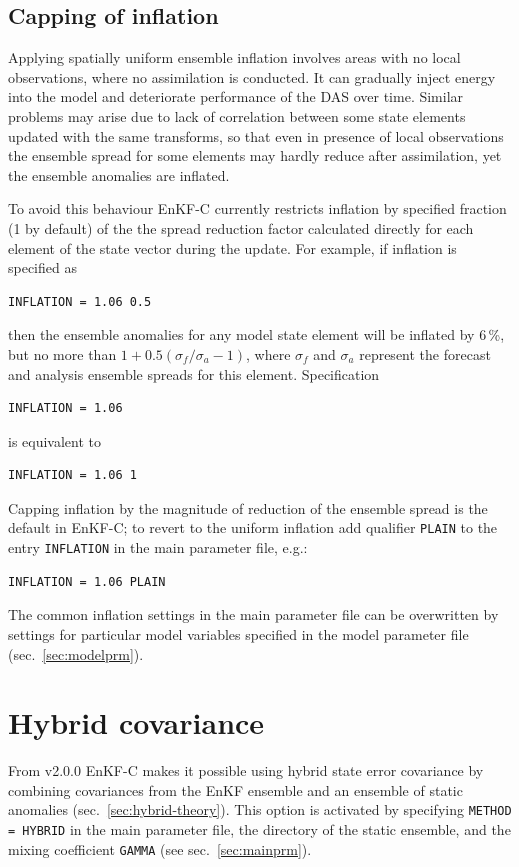 \documentclass[11pt]{report}
\begin{document}
\subsection{Capping of inflation}
\label{sec:capping}

Applying spatially uniform ensemble inflation involves areas with no local observations, where no assimilation is conducted.
It can gradually inject energy into the model and deteriorate performance of the DAS over time.
Similar problems may arise due to lack of correlation between some state elements updated with the same transforms, so that even in presence of local observations the ensemble spread for some elements may hardly reduce after assimilation, yet the ensemble anomalies are inflated.

To avoid this behaviour EnKF-C currently restricts inflation by specified fraction (1 by default) of the the spread reduction factor calculated directly for each element of the state vector during the update.
For example, if inflation is specified as
\begin{Verbatim}
INFLATION = 1.06 0.5
\end{Verbatim}
then the ensemble anomalies for any model state element will be inflated by 6\,\%, but no more than $1 + 0.5 (\sigma_f / \sigma_a - 1)$, where $\sigma_f$ and $\sigma_a$ represent the forecast and analysis ensemble spreads for this element.
Specification
\begin{Verbatim}
INFLATION = 1.06
\end{Verbatim}
is equivalent to
\begin{Verbatim}
INFLATION = 1.06 1
\end{Verbatim}
Capping inflation by the magnitude of reduction of the ensemble spread is the default in EnKF-C; to revert to the uniform inflation add qualifier \verb|PLAIN| to the entry \verb|INFLATION| in the main parameter file, e.g.:
\begin{Verbatim}
INFLATION = 1.06 PLAIN
\end{Verbatim}
The common inflation settings in the main parameter file can be overwritten by settings for particular model variables specified in the model parameter file (sec.~\ref{sec:modelprm}).

\section{Hybrid covariance}
\label{sec:hybrid-enkfc}

From v2.0.0 EnKF-C makes it possible using hybrid state error covariance by combining covariances from the EnKF ensemble and an ensemble of static anomalies (sec.~\ref{sec:hybrid-theory}).
This option is activated by specifying \verb|METHOD = HYBRID| in the main parameter file, the directory of the static ensemble, and the mixing coefficient \verb|GAMMA| (see sec.~\ref{sec:mainprm}).
\end{document}
